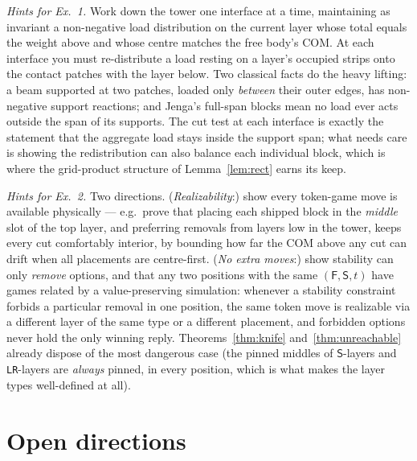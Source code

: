 \documentclass[11pt]{article}
\theoremstyle{definition}
\theoremstyle{remark}
\newcommand{\Fq}{\mathsf{F}}
\newcommand{\Sq}{\mathsf{S}}
\newcommand{\layer}[1]{\texttt{#1}}
\begin{document}
\medskip
\noindent\emph{Hints for Ex.\ 1.} Work down the tower one interface at a
time, maintaining as invariant a non-negative load distribution on the
current layer whose total equals the weight above and whose centre matches
the free body's COM. At each interface you must re-distribute a load
resting on a layer's occupied strips onto the contact patches with the
layer below. Two classical facts do the heavy lifting: a beam supported at
two patches, loaded only \emph{between} their outer edges, has non-negative
support reactions; and Jenga's full-span blocks mean no load ever acts
outside the span of its supports. The cut test at each interface is exactly
the statement that the aggregate load stays inside the support span; what
needs care is showing the redistribution can also balance each individual
block, which is where the grid-product structure of
Lemma~\ref{lem:rect} earns its keep.

\medskip
\noindent\emph{Hints for Ex.\ 2.} Two directions. (\emph{Realizability}:)
show every token-game move is available physically --- e.g.\ prove that
placing each shipped block in the \emph{middle} slot of the top layer, and
preferring removals from layers low in the tower, keeps every cut
comfortably interior, by bounding how far the COM above any cut can drift
when all placements are centre-first. (\emph{No extra moves}:) show
stability can only \emph{remove} options, and that any two positions with
the same $(\Fq,\Sq,t)$ have games related by a value-preserving simulation:
whenever a stability constraint forbids a particular removal in one
position, the same token move is realizable via a different layer of the
same type or a different placement, and forbidden options never hold the
only winning reply. Theorems~\ref{thm:knife} and~\ref{thm:unreachable}
already dispose of the most dangerous case (the pinned middles of
$\Sq$-layers and \layer{LR}-layers are \emph{always} pinned, in every
position, which is what makes the layer types well-defined at all).

\section{Open directions}
\end{document}

